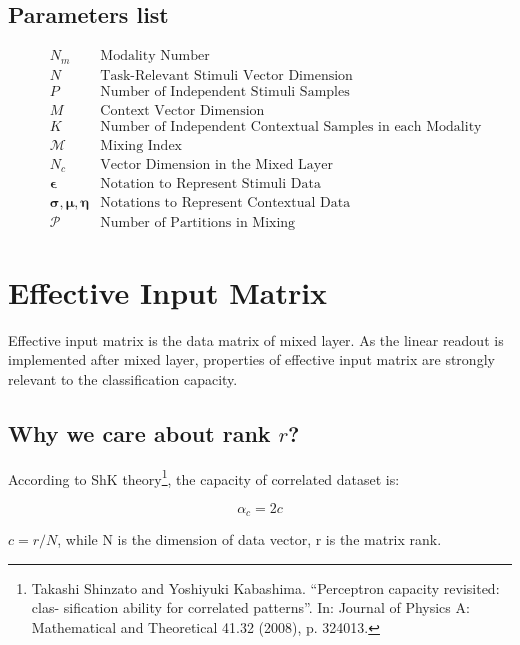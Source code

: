 \documentclass[conference]{acmsiggraph}
\begin{document}
\subsection{Parameters list}
\begin{align*}
    &N_m    &\text{Modality Number} \\
    &N      &\text{Task-Relevant Stimuli Vector Dimension} \\
    &P      &\text{Number of Independent Stimuli Samples} \\
    &M      &\text{Context Vector Dimension} \\
    &K      &\text{Number of Independent Contextual Samples in each Modality} \\
    &\mathcal{M}      &\text{Mixing Index} \\
    &N_c         &\text{Vector Dimension in the Mixed Layer} \\
    &\mathbf{\epsilon}    &\text{Notation to Represent Stimuli Data} \\
    &\mathbf{\sigma,\mu,\eta}  &\text{Notations to Represent Contextual Data} \\
    &\mathcal{P}     &\text{Number of Partitions in Mixing}
\end{align*}

\section{Effective Input Matrix}

Effective input matrix is the data matrix of mixed layer. As the linear readout is implemented after mixed layer, properties of effective input matrix are strongly relevant to the classification capacity. 

\subsection{Why we care about rank $r$?}

According to ShK theory\footnote{Takashi Shinzato and Yoshiyuki Kabashima. “Perceptron capacity revisited: clas- sification ability for correlated patterns”. In: Journal of Physics A: Mathematical and Theoretical 41.32 (2008), p. 324013.}, the capacity of correlated dataset is:

\begin{equation}
    \alpha_c = 2c
\end{equation}

$c = r/N$, while N is the dimension of data vector, r is the matrix rank.
\end{document}
